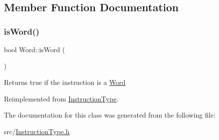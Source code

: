\subsection{Member Function Documentation}
\mbox{\label{classWord_a2dde02496b26f4c78881259cb44f70e5}} 
\subsubsection{\texorpdfstring{is\+Word()}{isWord()}}
{\footnotesize\ttfamily bool Word\+::is\+Word (\begin{DoxyParamCaption}{ }\end{DoxyParamCaption})\hspace{0.3cm}{\ttfamily [virtual]}}

Returns true if the instruction is a \hyperlink{classWord}{Word} 

Reimplemented from \hyperlink{classInstructionType_ab4c4569a2cafed0655f95d9a20bd8ea1}{Instruction\+Type}.



The documentation for this class was generated from the following file\+:\begin{DoxyCompactItemize}
\item 
src/\hyperlink{InstructionType_8h}{Instruction\+Type.\+h}\end{DoxyCompactItemize}
